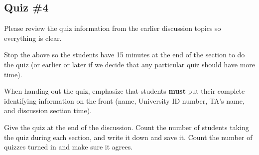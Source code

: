 \documentclass[12pt]{article}
\begin{document}
    \subsection{Quiz \#4}

      Please review the quiz information from the earlier discussion topics
    so everything is clear.

      Stop the above so the students have 15 minutes at the end of the section
    to do the quiz (or earlier or later if we decide that any particular
    quiz should have more time).

      When handing out the quiz, emphasize that students \textbf{must} put
    their complete identifying information on the front (name, University ID
    number, TA's name, and discussion section time).

      Give the quiz at the end of the discussion.  Count the number of
    students taking the quiz during each section, and write it down and save
    it.  Count the number of quizzes turned in and make sure it agrees.
\end{document}
